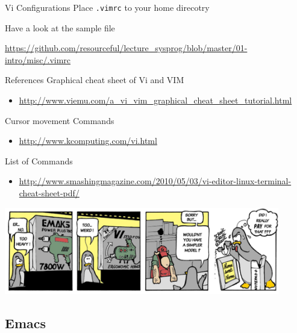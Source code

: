 \documentclass[newPxFont,sthlmFooter,nooffset]{beamer}
\begin{document}
\begin{frame}[t]{Vi Configurations}
Place \texttt{.vimrc} to your home direcotry

\bigskip
Have a look at the sample file

\url{https://github.com/resourceful/lecture_sysprog/blob/master/01-intro/misc/.vimrc}
\end{frame}

\begin{frame}[t]{References}
Graphical cheat sheet of Vi and VIM
\begin{itemize}
\item \url{http://www.viemu.com/a_vi_vim_graphical_cheat_sheet_tutorial.html}
\end{itemize}

Cursor movement Commands
\begin{itemize}
\item \url{http://www.kcomputing.com/vi.html}
\end{itemize}

List of Commands 
\begin{itemize}
\item \url{http://www.smashingmagazine.com/2010/05/03/vi-editor-linux-terminal-cheat-sheet-pdf/}
\end{itemize}

\bigskip\centering
\includegraphics[width=0.9\textwidth]{./figure/vi_tools.png}
\end{frame}




\subsection{Emacs}
\end{document}

